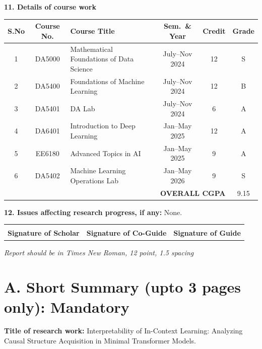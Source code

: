 \documentclass[12pt]{article}
\begin{document}
\bigskip
\noindent\textbf{11. Details of course work}
\begin{center}
\begin{tabular}{|c|c|p{4.6cm}|c|c|c|}
\hline
\textbf{S.No} & \textbf{Course No.} & \textbf{Course Title} & \textbf{Sem.\ \& Year} & \textbf{Credit} & \textbf{Grade}\\
\hline
1 & DA5000 & Mathematical Foundations of Data Science & July--Nov 2024 & 12 & S\\
\hline
2 & DA5400 & Foundations of Machine Learning & July--Nov 2024 & 12 & B\\
\hline
3 & DA5401 & DA Lab & July--Nov 2024 & 6 & A\\
\hline
4 & DA6401 & Introduction to Deep Learning & Jan--May 2025 & 12 & A\\
\hline
5 & EE6180 & Advanced Topics in AI & Jan--May 2025 & 9 & A\\
\hline
6 & DA5402 & Machine Learning Operations Lab & Jan--May 2026 & 9 & S\\
\hline
\multicolumn{5}{|r|}{\textbf{OVERALL CGPA}} & 9.15\\
\hline
\end{tabular}
\end{center}

\bigskip
\noindent\textbf{12. Issues affecting research progress, if any:} None.

\vspace{1.4cm}
\noindent\begin{tabular}{p{5cm}p{5cm}p{5cm}}
\hrulefill & \hrulefill & \hrulefill\\
\textbf{Signature of Scholar} & \textbf{Signature of Co-Guide} & \textbf{Signature of Guide}
\end{tabular}

\newpage
\noindent\textit{Report should be in Times New Roman, 12 point, 1.5 spacing}

\section*{A. Short Summary (upto 3 pages only): Mandatory}

\noindent\textbf{Title of research work:} Interpretability of In-Context Learning: Analyzing
Causal Structure Acquisition in Minimal Transformer Models.
\end{document}
